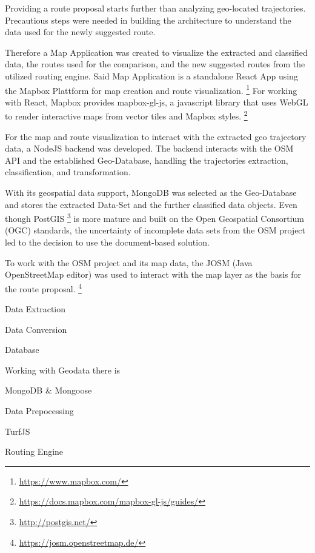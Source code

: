 Providing a route proposal starts further than analyzing geo-located trajectories. Precautious steps were needed in building the architecture to understand the data used for the newly suggested route. 

Therefore a Map Application was created to visualize the extracted and classified data, the routes used for the comparison, and the new suggested routes from the utilized routing engine. Said Map Application is a standalone React App using the Mapbox Plattform for map creation and route visualization. \footnote{\url{https://www.mapbox.com/}} For working with React, Mapbox provides mapbox-gl-js, a javascript library that uses WebGL to render interactive maps from vector tiles and Mapbox styles. \footnote{\url{https://docs.mapbox.com/mapbox-gl-js/guides/}}

For the map and route visualization to interact with the extracted geo trajectory data, a NodeJS backend was developed. The backend interacts with the OSM API and the established Geo-Database, handling the trajectories extraction, classification, and transformation.

With its geospatial data support, MongoDB was selected as the Geo-Database and stores the extracted Data-Set and the further classified data objects. Even though PostGIS \footnote{\url{http://postgis.net/}} is more mature and built on the Open Geospatial Consortium (OGC) standards, the uncertainty of incomplete data sets from the OSM project led to the decision to use the document-based solution.

To work with the OSM project and its map data, the JOSM (Java OpenStreetMap editor) was used to interact with the map layer as the basis for the route proposal. \footnote{\url{https://josm.openstreetmap.de/}}



Data Extraction


Data Conversion


Database

Working with Geodata there is 

MongoDB & Mongoose



Data Prepocessing

TurfJS

Routing Engine

